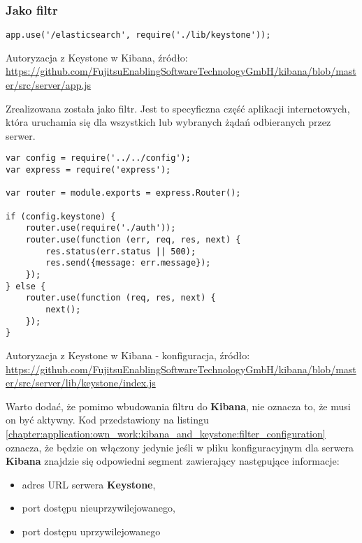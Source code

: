     \subsubsection{Jako filtr}
    \begin{listing}
        \begin{verbatim}
app.use('/elasticsearch', require('./lib/keystone'));
        \end{verbatim}
        \label{chapter:application:own_work:kibana_and_keystone:filter_code}
        \caption[Autoryzacja z Keystone w Kibana]{Autoryzacja z Keystone w Kibana, źródło: \url{https://github.com/FujitsuEnablingSoftwareTechnologyGmbH/kibana/blob/master/src/server/app.js}}
    \end{listing}
    Zrealizowana została jako filtr. Jest to specyficzna część aplikacji internetowych, która
    uruchamia się dla wszystkich lub wybranych żądań odbieranych przez serwer.
    
    \begin{listing}
        \begin{verbatim}
var config = require('../../config');
var express = require('express');

var router = module.exports = express.Router();

if (config.keystone) {
    router.use(require('./auth'));
    router.use(function (err, req, res, next) {
        res.status(err.status || 500);
        res.send({message: err.message});
    });
} else {
    router.use(function (req, res, next) {
        next();
    });
}
        \end{verbatim}
        \label{chapter:application:own_work:kibana_and_keystone:filter_configuration}
        \caption[Autoryzacja z Keystone w Kibana - konfiguracja]{Autoryzacja z Keystone w Kibana - konfiguracja, źródło: \url{https://github.com/FujitsuEnablingSoftwareTechnologyGmbH/kibana/blob/master/src/server/lib/keystone/index.js}}
    \end{listing}
    
    Warto dodać, że pomimo wbudowania filtru do \textbf{Kibana}, nie oznacza to, że musi on być aktywny. Kod
    przedstawiony na listingu \ref{chapter:application:own_work:kibana_and_keystone:filter_configuration} oznacza,
    że będzie on włączony jedynie jeśli w pliku konfiguracyjnym dla serwera \textbf{Kibana} znajdzie się odpowiedni
    segment zawierający następujące informacje:
    \begin{itemize}
        \item adres URL serwera \textbf{Keystone},
        \item port dostępu nieuprzywilejowanego,
        \item port dostępu uprzywilejowanego
    \end{itemize}
    
